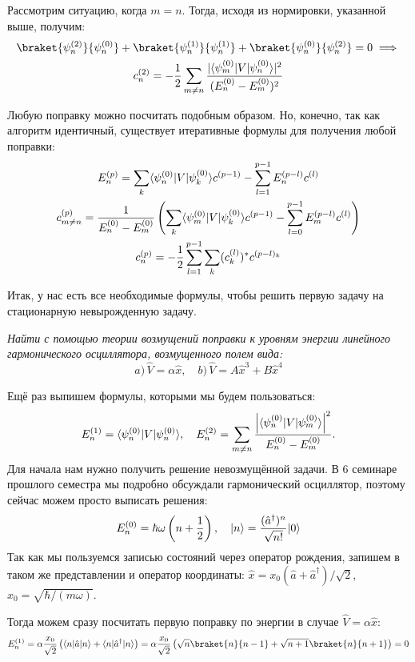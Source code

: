 Рассмотрим ситуацию, когда $m=n$. Тогда, исходя из нормировки, указанной выше,
получим:
\begin{gather*}
  \braket{\psi^{(2)}_n}{\psi^{(0)}_n} + \braket{\psi^{(1)}_n}{\psi^{(1)}_n} + \braket{\psi^{(0)}_n}{\psi^{(2)}_n} = 0 \implies\\
  c^{(2)}_n = -\frac{1}{2}\sum\limits_{m\neq n}\frac{|\bra{\psi^{(0)}_m}V\ket{\psi^{(0)}_n}|^2}{(E^{(0)}_n - E^{(0)}_m)^2}
\end{gather*}

Любую поправку можно посчитать подобным образом. Но, конечно, так как алгоритм
идентичный, существует итеративные формулы для получения любой поправки:
\begin{gather*}
  E^{(p)}_n = \sum_{k}\langle\psi^{(0)}_n\rvert V\lvert\psi^{(0)}_k\rangle c^{(p-1)} - \sum_{l=1}^{p-1}E^{(p-l)}_nc^{(l)}\\
  c^{(p)}_{m\neq n} = \frac{1}{E^{(0)}_{n} - E^{(0)}_{m}}\left(\sum_{k}\langle\psi^{(0)}_m\rvert V\lvert\psi^{(0)}_k\rangle c^{(p-1)} - \sum_{l=0}^{p-1}E^{(p-l)}_m c^{(l)}\right) \\
  c^{(p)}_{n} = -\frac{1}{2}\sum\limits_{l=1}^{p-1}\sum_{k}(c^{(l)}_k)^*c^{(p-l)_k}
\end{gather*}

Итак, у нас есть все необходимые формулы, чтобы решить первую задачу на
стационарную невырожденную задачу.
\begin{exercise}
  \textit{Найти с помощью теории возмущений поправки к уровням энергии линейного
    гармонического осциллятора, возмущенного полем вида:}
  \[
    a)\,\hat{V} = \alpha \hat{x},\quad b)\,\hat{V} = A\hat{x}^3 + B\hat{x}^4
  \]
\end{exercise}
Ещё раз выпишем формулы, которыми мы будем пользоваться:
\[
  E_n^{(1)} = \langle\psi_n^{(0)}\rvert V\lvert\psi_n^{(0)}\rangle, \quad E_n^{(2)} = \sum\limits_{m\neq n} \frac{\left| \langle\psi_n^{(0)}\rvert V \lvert\psi_m^{(0)}\rangle \right|^2}{E_n^{(0)}-E_m^{(0)}}.
\]
Для начала нам нужно получить решение невозмущённой задачи. В 6 семинаре
прошлого семестра мы подробно обсуждали гармонический осциллятор, поэтому
сейчас можем просто выписать решения:
\[
  E_n^{(0)} = \hbar\omega\left(n+\frac{1}{2}\right), \quad \lvert n\rangle = \frac{(\hat{a}^{\dagger})^n}{\sqrt{n!}}\lvert0\rangle
\]
Так как мы пользуемся записью состояний через оператор рождения, запишем в
таком же представлении и оператор координаты: $\hat{x} =
  x_0(\hat{a}+\hat{a}^{\dagger})/{\sqrt{2}}$, $x_0 = \sqrt{\hbar/(m\omega)}$.

Тогда можем сразу посчитать первую поправку по энергии в случае $\hat{V}=\alpha
  \hat{x}$:
\[
  E_n^{(1)} = \alpha\frac{x_0}{\sqrt{2}}\left(\bra{n}\hat{a}\ket{n}+\bra{n}\hat{a}^{\dagger}\ket{n}\right) = \alpha\frac{x_0}{\sqrt{2}}\left(\sqrt{n}\braket{n}{n-1}+\sqrt{n+1}\braket{n}{n+1}\right) = 0
\]

